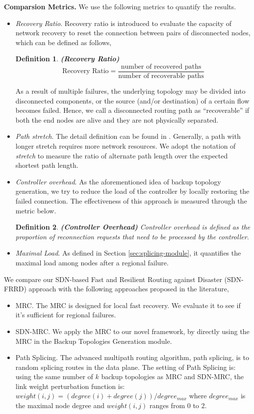 \documentclass[10pt,journal]{IEEEtran}
\newtheorem{definition}{Definition}
\begin{document}
 \textbf{Comparsion Metrics.} We use the following metrics to quantify the results\cite{motiwala2008path, wangfast}.
\begin{itemize}
\item \emph{Recovery Ratio}.
Recovery ratio is introduced to evaluate the capacity of network recovery to reset the connection between pairs of disconnected nodes, which can be defined as follows,
\begin{definition}
\textbf{(Recovery Ratio)}
$$\mbox{Recovery Ratio}= {\frac{\mbox{number of recovered paths}}{\mbox{number of recoverable paths}}}$$
\end{definition}
As a result of multiple failures, the underlying topology may be divided into disconnected components, or the source (and/or destination) of a certain flow becomes failed. Hence, we call a disconnected routing path as ``recoverable'' if both the end nodes are alive and they are not physically separated.
\item \emph{Path stretch}. The detail definition can be found in \cite{W13fcr}. Generally, a path with longer stretch requires more network resources. We adopt the notation of \emph{stretch} to measure the ratio of alternate path length over the expected shortest path length.
\item \emph{Controller overhead}. As the aforementioned idea of backup topology generation, we try to reduce the load of the controller by locally restoring the failed connection. The effectiveness of this approach is measured through the metric below.
\begin{definition}
\textbf{(Controller Overhead)}
Controller overhead is defined as the proportion of reconnection requests that need to be processed by the controller.
\end{definition}
\item \emph{Maximal Load}. As defined in Section \ref{sec:splicing-module}, it quantifies the maximal load among nodes after a regional failure.
\end{itemize}


We compare our SDN-based Fast and Resilient Routing against Disaster (SDN-FRRD) approach with the following approaches proposed in the literature,
 \begin{itemize}
\item MRC\cite{kvalbein2006fast}. The MRC is designed for local fast recovery. We evaluate it to see if it's sufficient for regional failures.
\item SDN-MRC. We apply the MRC to our novel framework, by directly using the MRC in the Backup Topologies Generation module.
\item Path Splicing\cite{motiwala2008path}. The advanced multipath routing algorithm, path splicing, is to random splicing routes in the data plane. The setting of Path Splicing is: using the same number of $k$ backup topologies as MRC and SDN-MRC, the link weight perturbation function is: $weight(i,j)=(degree(i)+degree(j))/degree_{max}$ where $degree_{max}$ is the maximal node degree and $weight(i,j)$ ranges from $0$ to $2$.
\end{itemize}
\end{document}
